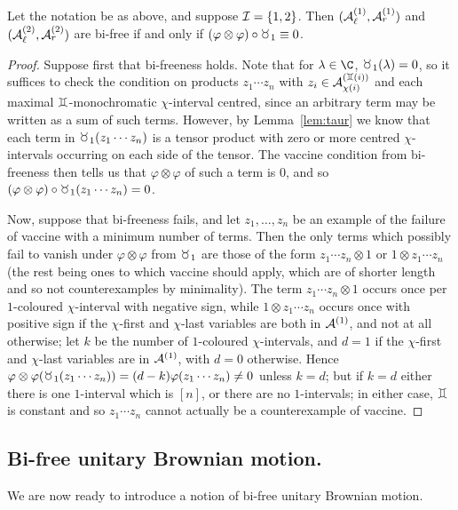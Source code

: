 \begin{theorem}
	Let the notation be as above, and suppose $\mathcal{I} = \left\{1,2\right\}$.
	Then $(\mathcal{A}_\ell^{(1)}, \mathcal{A}_r^{(1)})$ and $(\mathcal{A}_\ell^{(2)}, \mathcal{A}_r^{(2)})$ are bi-free if and only if $(\varphi\otimes\varphi)\circ\taur_{1} \equiv 0$.
\end{theorem}

\begin{proof}
	Suppose first that bi-freeness holds.
	Note that for $\lambda \in \C$, $\taur_1(\lambda) = 0$, so it suffices to check the condition on products $z_1\cdots z_n$ with $z_i \in \A_{\chi(i)}^{(\gem(i))}$ and each maximal $\gem$-monochromatic $\chi$-interval centred, since an arbitrary term may be written as a sum of such terms.
	However, by Lemma~\ref{lem:taur} we know that each term in $\taur_1(z_1\cdots z_n)$ is a tensor product with zero or more centred $\chi$-intervals occurring on each side of the tensor. The vaccine condition from bi-freeness then tells us that $\varphi\otimes\varphi$ of such a term is $0$, and so $(\varphi\otimes\varphi)\circ\taur_1(z_1\cdots z_n) = 0$.

	Now, suppose that bi-freeness fails, and let $z_1, \ldots, z_n$ be an example of the failure of vaccine with a minimum number of terms.
	Then the only terms which possibly fail to vanish under $\varphi\otimes\varphi$ from $\taur_1$ are those of the form $z_1\cdots z_n\otimes 1$ or $1\otimes z_1\cdots z_n$ (the rest being ones to which vaccine should apply, which are of shorter length and so not counterexamples by minimality).
	The term $z_1\cdots z_n\otimes1$ occurs once per $1$-coloured $\chi$-interval with negative sign, while $1\otimes z_1\cdots z_n$ occurs once with positive sign if the $\chi$-first and $\chi$-last variables are both in $\mathcal{A}^{(1)}$, and not at all otherwise; let $k$ be the number of $1$-coloured $\chi$-intervals, and $d = 1$ if the $\chi$-first and $\chi$-last variables are in $\mathcal{A}^{(1)}$, with $d = 0$ otherwise.
	Hence $\varphi\otimes\varphi(\taur_1(z_1\cdots z_n)) = (d-k)\varphi(z_1\cdots z_n) \neq 0$ unless $k = d$; but if $k = d$ either there is one $1$-interval which is $[n]$, or there are no $1$-intervals; in either case, $\gem$ is constant and so $z_1\cdots z_n$ cannot actually be a counterexample of vaccine.
\end{proof}



\subsection{Bi-free unitary Brownian motion.}
We are now ready to introduce a notion of bi-free unitary Brownian motion.

